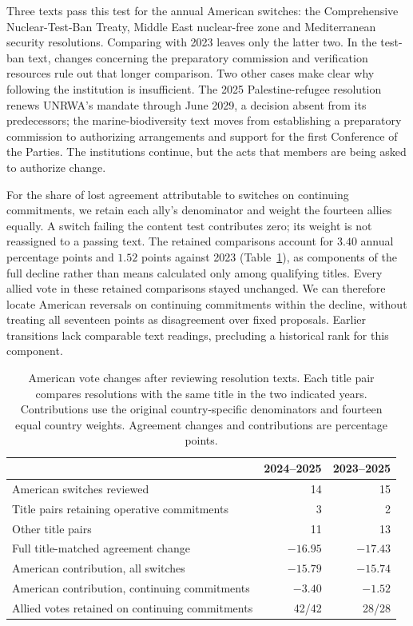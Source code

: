 \documentclass[10pt,authoryear]{elsarticle}
\begin{document}
Three texts pass this test for the annual American switches: the Comprehensive Nuclear-Test-Ban Treaty, Middle East nuclear-free zone and Mediterranean security resolutions. Comparing with 2023 leaves only the latter two. In the test-ban text, changes concerning the preparatory commission and verification resources rule out that longer comparison. Two other cases make clear why following the institution is insufficient. The 2025 Palestine-refugee resolution renews UNRWA's mandate through June 2029, a decision absent from its predecessors; the marine-biodiversity text moves from establishing a preparatory commission to authorizing arrangements and support for the first Conference of the Parties. The institutions continue, but the acts that members are being asked to authorize change.

For the share of lost agreement attributable to switches on continuing commitments, we retain each ally's denominator and weight the fourteen allies equally. A switch failing the content test contributes zero; its weight is not reassigned to a passing text. The retained comparisons account for $3.40$ annual percentage points and $1.52$ points against 2023 (Table~\ref{tab:content_contributions}), as components of the full decline rather than means calculated only among qualifying titles. Every allied vote in these retained comparisons stayed unchanged. We can therefore locate American reversals on continuing commitments within the decline, without treating all seventeen points as disagreement over fixed proposals. Earlier transitions lack comparable text readings, precluding a historical rank for this component.

\begin{table}[ht]
\centering\small
\caption{American vote changes after reviewing resolution texts. Each title pair compares resolutions with the same title in the two indicated years. Contributions use the original country-specific denominators and fourteen equal country weights. Agreement changes and contributions are percentage points.}
\label{tab:content_contributions}
\begin{tabular}{lrr}\toprule
 & 2024--2025 & 2023--2025\\\midrule
American switches reviewed & 14 & 15\\
Title pairs retaining operative commitments & 3 & 2\\
Other title pairs & 11 & 13\\
Full title-matched agreement change & $-16.95$ & $-17.43$\\
American contribution, all switches & $-15.79$ & $-15.74$\\
American contribution, continuing commitments & $-3.40$ & $-1.52$\\
Allied votes retained on continuing commitments & 42/42 & 28/28\\\bottomrule
\end{tabular}
\end{table}
\end{document}
